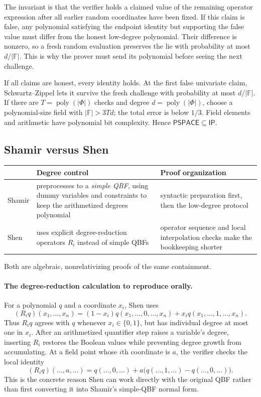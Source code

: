 \documentclass[10pt]{article}
\newcommand{\F}{\mathbb F}
\newcommand{\IP}{\mathsf{IP}}
\newcommand{\PSPACE}{\mathsf{PSPACE}}
\begin{document}
The invariant is that the verifier holds a claimed value of the remaining operator
expression after all earlier random coordinates have been fixed.  If this claim is
false, any polynomial satisfying the endpoint identity but supporting the false value
must differ from the honest low-degree polynomial.  Their difference is nonzero, so a
fresh random evaluation preserves the lie with probability at most $d/|\F|$.  This is
why the prover must send its polynomial before seeing the next challenge.

If all claims are honest, every identity holds.  At the first false univariate
claim, Schwartz--Zippel lets it survive the fresh challenge with probability at
most $d/|\F|$.  If there are $T=\operatorname{poly}(|\Phi|)$ checks and degree
$d=\operatorname{poly}(|\Phi|)$, choose a polynomial-size field with
$|\F|>3Td$; the total error is below $1/3$.  Field elements and arithmetic have
polynomial bit complexity.  Hence $\PSPACE\subseteq\IP$.

\subsection{Shamir versus Shen}

\begin{center}\small
\begin{tabularx}{\textwidth}{@{}lXX@{}}
\toprule
& \textbf{Degree control} & \textbf{Proof organization}\\
\midrule
Shamir & preprocesses to a \emph{simple QBF}, using dummy variables and
constraints to keep the arithmetized degrees polynomial & syntactic preparation
first, then the low-degree protocol\\
Shen & uses explicit degree-reduction operators $R_i$ instead of simple QBFs &
operator sequence and local interpolation checks make the bookkeeping shorter\\
\bottomrule
\end{tabularx}
\end{center}
Both are algebraic, nonrelativizing proofs of the same containment.

\paragraph{The degree-reduction calculation to reproduce orally.}
For a polynomial $q$ and a coordinate $x_i$, Shen uses
\[
 (R_iq)(x_1,\ldots,x_n)
 =(1-x_i)q(x_1,\ldots,0,\ldots,x_n)
   +x_iq(x_1,\ldots,1,\ldots,x_n).
\]
Thus $R_iq$ agrees with $q$ whenever $x_i\in\{0,1\}$, but has individual
degree at most one in $x_i$.  After an arithmetized quantifier step raises a
variable's degree, inserting $R_i$ restores the Boolean values while preventing
degree growth from accumulating.  At a field point whose $i$th coordinate is
$a$, the verifier checks the local identity
\[
 (R_iq)(\ldots,a,\ldots)
 =q(\ldots,0,\ldots)+a\bigl(q(\ldots,1,\ldots)-q(\ldots,0,\ldots)\bigr).
\]
This is the concrete reason Shen can work directly with the original QBF rather
than first converting it into Shamir's simple-QBF normal form.
\end{document}
